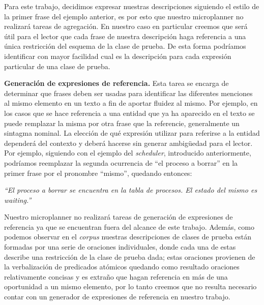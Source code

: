 \medskip
\noindent
Para este trabajo, decidimos expresar nuestras descripciones siguiendo el estilo de la primer frase del ejemplo anterior, es por esto que nuestro microplanner no realizará tareas de agregación. En nuestro caso en particular creemos que será útil para el lector que cada frase de nuestra descripción haga referencia a una única restricción del esquema de la clase de prueba. De esta forma podríamos identificar con mayor facilidad cual es la descripción para cada expresión particular de una clase de prueba.


\medskip
\noindent
\textbf{Generación de expresiones de referencia.} Esta tarea se encarga de determinar que frases deben ser usadas para identificar las diferentes menciones al mismo elemento en un texto a fin de aportar fluidez al mismo. Por ejemplo, en los casos que se hace referencia a una entidad que ya ha aparecido en el texto se puede remplazar la misma por otra frase que la referencie, generalmente un sintagma nominal. La elección de qué expresión utilizar para referirse a la entidad dependerá del contexto y deberá hacerse sin generar ambigüedad para el lector. Por ejemplo, siguiendo con el ejemplo del \emph{scheduler}, introducido anteriormente, podríamos reemplazar la segunda ocurrencia de ``el proceso a borrar'' en la primer frase por el pronombre ``mismo'', quedando entonces:

\smallskip
\begin{center}
\emph{``El proceso a borrar se encuentra en la tabla de procesos. El estado del mismo es waiting.''} 
\end{center}

\smallskip
Nuestro microplanner no realizará tareas de generación de expresiones de referencia ya que se encuentran fuera del alcance de este trabajo. Además, como podemos observar en el \emph{corpus} nuestras descripciones de clases de prueba están formadas por una serie de oraciones individuales, donde cada una de estas describe una restricción de la clase de prueba dada; estas oraciones provienen de la verbalización de predicados atómicos quedando como resultado oraciones relativamente concisas y es extraño que hagan referencia en más de una oportunidad a un mismo elemento, por lo tanto creemos que no resulta necesario contar con un generador de expresiones de referencia en nuestro trabajo.



